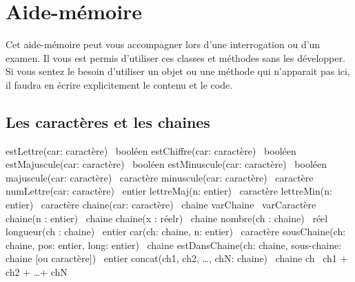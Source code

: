 \chapter{Aide-mémoire}

Cet aide-mémoire peut vous accompagner lors d'une
interrogation ou d'un examen. Il vous est permis
d’utiliser ces classes et méthodes sans les développer.
Si vous sentez le besoin d’utiliser un objet ou une méthode qui
n'apparait pas ici, il faudra en écrire explicitement
le contenu et le code.

\section{Les caractères et les chaines}

\begin{Pseudocode}
	\Empty
	\Stmt estLettre(car: caractère) \Gives~booléen		
	\Stmt estChiffre(car: caractère) \Gives~booléen		
	\Stmt estMajuscule(car: caractère) \Gives~booléen	
	\Stmt estMinuscule(car: caractère) \Gives~booléen	
	\Empty
	\Empty
	\Stmt majuscule(car: caractère) \Gives~caractère	
	\Stmt minuscule(car: caractère) \Gives~caractère	
	\Stmt numLettre(car: caractère) \Gives~entier		
	\Stmt lettreMaj(n: entier) \Gives~caractère			
	\Stmt lettreMin(n: entier) \Gives~caractère			
	\Stmt chaine(car: caractère) \Gives~chaine			
	\Let varChaine \Gets~varCaractère					
	\Stmt chaine(n : entier) \Gives~chaine				
	\Stmt chaine(x : réelr) \Gives~chaine				
	\Stmt nombre(ch : chaine) \Gives~réel				
	\Empty
	\Empty
	\Stmt longueur(ch : chaine) \Gives~entier			
	\Stmt car(ch: chaine, n: entier) \Gives~caractère	
	\Stmt sousChaine(ch: chaine, pos: entier, long: entier) \Gives~chaine 
	\Stmt estDansChaine(ch: chaine, sous-chaine: chaine [ou caractère]) \Gives~entier 
	\Stmt 	{}
	\Stmt concat(ch1, ch2, \dots, chN: chaine) \Gives~chaine 	
	\Let  ch \Gets~ch1 + ch2 + \dots + chN						
\end{Pseudocode}

